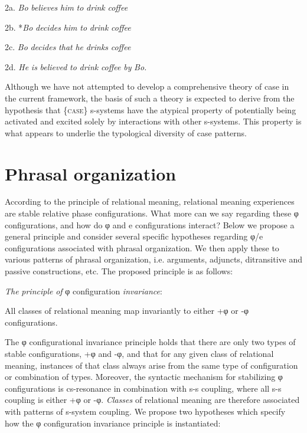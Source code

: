   2a.  \textit{Bo} \textit{believes} \textit{him} \textit{to} \textit{drink} \textit{coffee}

  2b.  *\textit{Bo} \textit{decides} \textit{him} \textit{to} \textit{drink} \textit{coffee}

  2c.  \textit{Bo} \textit{decides} \textit{that} \textit{he} \textit{drinks} \textit{coffee}

  2d.   \textit{He} \textit{is} \textit{believed} \textit{to} \textit{drink} \textit{coffee} \textit{by} \textit{Bo.}

  Although we have not attempted to develop a comprehensive theory of case in the current framework, the basis of such a theory is expected to derive from the hypothesis that \{\textsc{case}\} s-systems have the atypical property of potentially being activated and excited solely by interactions with other s-systems. This property is what appears to underlie the typological diversity of case patterns. 

\section{Phrasal organization}

According to the principle of relational meaning, relational meaning experiences are stable relative phase configurations. What more can we say regarding these φ configurations, and how do φ and e configurations interact? Below we propose a general principle and consider several specific hypotheses regarding φ/e configurations associated with phrasal organization. We then apply these to various patterns of phrasal organization, i.e. arguments, adjuncts, ditransitive and passive constructions, etc. The proposed principle is as follows:

\textit{The} \textit{principle} \textit{of} φ configuration \textit{invariance}: 

  All classes of relational meaning map invariantly to either +φ or -φ configurations. 

  The φ configurational invariance principle holds that there are only two types of stable configurations, +φ and -φ, and that for any given class of relational meaning, instances of that class always arise from the same type of configuration or combination of types. Moreover, the syntactic mechanism for stabilizing φ configurations is cs-resonance in combination with s-s coupling, where all s-s coupling is either +φ or -φ. \textit{Classes} of relational meaning are therefore associated with patterns of s-system coupling. We propose two hypotheses which specify how the φ configuration invariance principle is instantiated:

